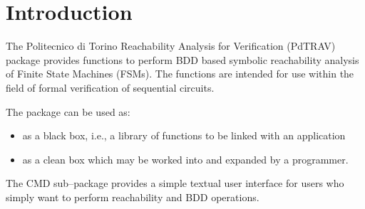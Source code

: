 \section{Introduction} 

The Politecnico di Torino Reachability Analysis for Verification
(PdTRAV) package provides functions to perform BDD based
symbolic reachability analysis of Finite State Machines (FSMs).
The functions are intended for use within the field of formal verification
of sequential circuits. 

The package can be used as:
\begin{itemize}
\item
as a black box, i.e., a library of functions to be linked with an application
\item
as a clean box which may be worked into and expanded by a programmer.
\end{itemize}

The CMD sub--package provides a simple textual user interface for
users who simply want to perform reachability and BDD operations.

